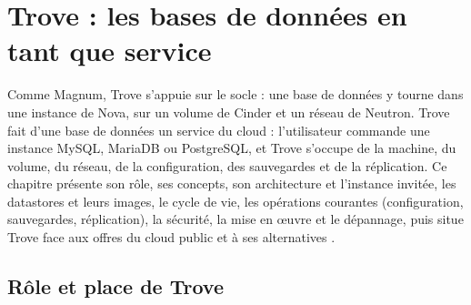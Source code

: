 
\section{Trove : les bases de données en tant que service}\label{chap:trove}

Comme Magnum, Trove s'appuie sur le socle : une base de données y tourne dans une instance de Nova, sur un volume de Cinder et
un réseau de Neutron. Trove fait d'une base de données un service du cloud : l'utilisateur commande une instance MySQL, MariaDB
ou PostgreSQL, et Trove s'occupe de la machine, du volume, du réseau, de la configuration, des sauvegardes et de la réplication.
Ce chapitre présente son rôle, ses concepts, son architecture et l'instance invitée, les datastores et leurs images, le cycle de
vie, les opérations courantes (configuration, sauvegardes, réplication), la sécurité, la mise en œuvre et le dépannage, puis
situe Trove face aux offres du cloud public et à ses alternatives \parencite{trove-overview}.

\subsection{Rôle et place de Trove}\label{sec:tr-role}

